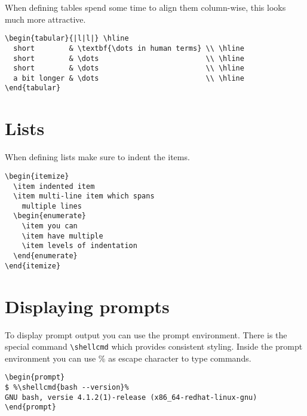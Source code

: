 \documentclass[11pt,a4paper]{article}
\begin{document}
When defining tables spend some time to align them column-wise, this looks much more attractive.

\begin{verbatim}
\begin{tabular}{|l|l|} \hline
  short        & \textbf{\dots in human terms} \\ \hline
  short        & \dots                         \\ \hline
  short        & \dots                         \\ \hline
  a bit longer & \dots                         \\ \hline
\end{tabular}
\end{verbatim}

\section{Lists}
\label{sec:lists}

When defining lists make sure to indent the items.

\begin{verbatim}
\begin{itemize}
  \item indented item
  \item multi-line item which spans
    multiple lines
  \begin{enumerate}
    \item you can
    \item have multiple
    \item levels of indentation
  \end{enumerate}
\end{itemize}
\end{verbatim}

\section{Displaying prompts}
\label{sec:displaying-prompts}

To display prompt output you can use the prompt environment. There is the
special command \texttt{\textbackslash{}shellcmd{}} which provides consistent
styling. Inside the prompt environment you can use \% as escape character to
type commands.

\begin{verbatim}
\begin{prompt}
$ %\shellcmd{bash --version}%
GNU bash, versie 4.1.2(1)-release (x86_64-redhat-linux-gnu)
\end{prompt}
\end{verbatim}
\end{document}
